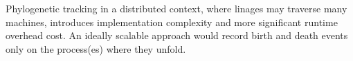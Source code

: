 Phylogenetic tracking in a distributed context, where linages may traverse many machines, introduces implementation complexity and more significant runtime overhead cost.
%
An ideally scalable approach would record birth and death events only on the process(es) where they unfold.


